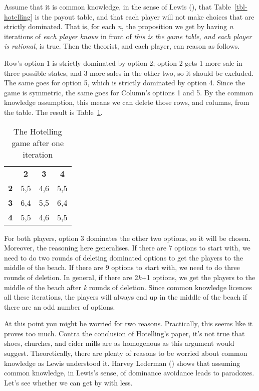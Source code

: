 \documentclass[
  10pt,
  letterpaper,
  twoside]{scrbook}
\begin{document}
Assume that it is common knowledge, in the sense of Lewis
(), that Table~\ref{tbl-hotelling} is the
payout table, and that each player will not make choices that are
strictly dominated. That is, for each \emph{n}, the proposition we get
by having \emph{n} iterations of \emph{each player knows} in front of
\emph{this is the game table, and each player is rational}, is true.
Then the theorist, and each player, can reason as follows.

Row's option 1 is strictly dominated by option 2; option 2 gets 1 more
sale in three possible states, and 3 more sales in the other two, so it
should be excluded. The same goes for option 5, which is strictly
dominated by option 4. Since the game is symmetric, the same goes for
Column's options 1 and 5. By the common knowledge assumption, this means
we can delete those rows, and columns, from the table. The result is
Table~\ref{tbl-hotelling-iterated}.

\begin{longtable}[]{@{}lccc@{}}
\caption{The Hotelling game after one
iteration}\label{tbl-hotelling-iterated}\tabularnewline
\toprule\noalign{}
\endfirsthead
\endhead
\bottomrule\noalign{}
\endlastfoot
& \textbf{2} & \textbf{3} & \textbf{4} \\
\textbf{2} & 5,5 & 4,6 & 5,5 \\
\textbf{3} & 6,4 & 5,5 & 6,4 \\
\textbf{4} & 5,5 & 4,6 & 5,5 \\
\end{longtable}

For both players, option 3 dominates the other two options, so it will
be chosen. Moreover, the reasoning here generalises. If there are 7
options to start with, we need to do two rounds of deleting dominated
options to get the players to the middle of the beach. If there are 9
options to start with, we need to do three rounds of deletion. In
general, if there are 2\emph{k}+1 options, we get the players to the
middle of the beach after \emph{k} rounds of deletion. Since common
knowledge licences all these iterations, the players will always end up
in the middle of the beach if there are an odd number of options.

At this point you might be worried for two reasons. Practically, this
seems like it proves too much. Contra the conclusion of Hotelling's
paper, it's not true that shoes, churches, and cider mills are as
homogenous as this argument would suggest. Theoretically, there are
plenty of reasons to be worried about common knowledge as Lewis
understood it. Harvey Lederman () shows
that assuming common knowledge, in Lewis's sense, of dominance avoidance
leads to paradoxes. Let's see whether we can get by with less.
\end{document}
